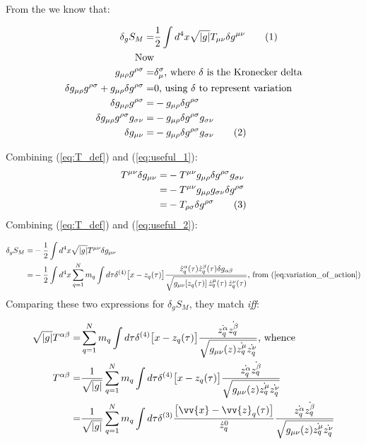 \documentclass[]{article}
\newcommand\numberthis{\addtocounter{equation}{1}\tag{\theequation}}
\begin{document}
From the \cite[(73)]{akhmedev2016} we know that:

\begin{align*}
\delta_g S_M =& \frac{1}{2} \int d^4 x \sqrt{|g|} T_{\mu\nu} \delta g^{\mu\nu} \numberthis \label {eq:T_def} \\
\text{Now}&\\
g_{\mu\rho}g^{\rho\sigma} =& \delta_{\mu}^{\sigma} \text{, where $\delta$ is the Kronecker delta}\\
\delta g_{\mu\rho}g^{\rho\sigma} + g_{\mu\rho}\delta g^{\rho\sigma} =& 0 \text{, using $\delta$ to represent variation}\\
\delta g_{\mu\rho}g^{\rho\sigma} =& - g_{\mu\rho}\delta g^{\rho\sigma}\\
\delta g_{\mu\rho}g^{\rho\sigma} g_{\sigma\nu} =& - g_{\mu\rho}\delta g^{\rho\sigma} g_{\sigma\nu} \\
\delta g_{\mu\nu} =& - g_{\mu\rho}\delta g^{\rho\sigma} g_{\sigma\nu} \numberthis \label {eq:useful_1}
\end{align*}

Combining (\ref{eq:T_def}) and (\ref{eq:useful_1}):
\begin{align*}
T^{\mu\nu}\delta g_{\mu\nu} =& - T^{\mu\nu} g_{\mu\rho}\delta g^{\rho\sigma} g_{\sigma\nu}\\
=& - T^{\mu\nu} g_{\mu\rho} g_{\sigma\nu} \delta g^{\rho\sigma}\\
=& -T_{\rho\sigma}\delta g^{\rho\sigma} \numberthis \label {eq:useful_2}
\end{align*}
Combining (\ref{eq:T_def}) and (\ref{eq:useful_2}):

\begin{align*}
\delta_g S_M =& - \frac{1}{2} \int d^4 x \sqrt{|g|} T^{\mu\nu} \delta g_{\mu\nu}\\
=& - \frac{1}{2} \int d^4 x \sum_{q=1}^N m_q \int d \tau \delta^{(4)} \big[x - z_q(\tau)\big] \frac{ \dot{z}_q^\alpha(\tau) \dot{z}_q^\beta(\tau) \delta g_{\alpha\beta}}{ \sqrt{g_{\mu\nu}[z_q(\tau)] \, \dot{z}_q^\mu(\tau)\, \dot{z}_q^\nu(\tau)}} \text{, from (\ref{eq:variation_of_action})}
\end{align*}
Comparing these two expressions for $\delta_g S_M$, they match \emph{iff}:

\begin{align*}
\sqrt{|g|} T^{\alpha\beta} =&  \sum_{q=1}^{N} m_q \int d\tau \delta^{(4)} \big[x-z_q(\tau)\big]\frac{\dot{z_q^\alpha} \dot{z_q^\beta}}{\sqrt{g_{\mu\nu}(z)\dot{z_q^\mu}\dot{z_q^\nu}}} \text{, whence} \\
T^{\alpha\beta} =& \frac{1}{\sqrt{|g|}} \sum_{q=1}^{N} m_q \int d\tau \delta^{(4)} \big[x-z_q(\tau)\big]\frac{\dot{z_q^\alpha} \dot{z_q^\beta}}{\sqrt{g_{\mu\nu}(z)\dot{z_q^\mu}\dot{z_q^\nu}}} \\
=& \frac{1}{\sqrt{|g|}} \sum_{q=1}^{N} m_q \int d\tau \delta^{(3)} \frac{\big[\vv{x}-\vv{z}_q(\tau)\big]}{\dot{z}_q^0}\frac{\dot{z_q^\alpha}  \dot{z_q^\beta}}{\sqrt{g_{\mu\nu}(z)\dot{z_q^\mu}\dot{z_q^\nu}}}
\end{align*}
\end{document}
